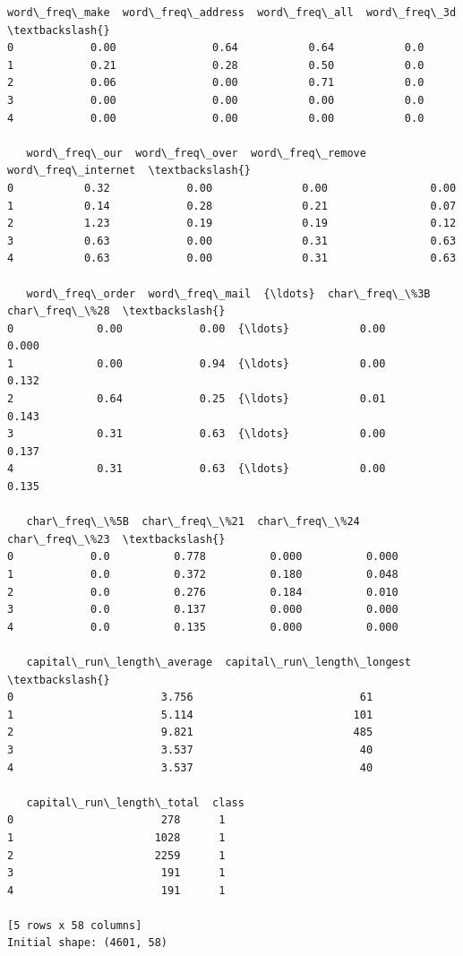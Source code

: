 \documentclass[12pt]{article}
\begin{document}
 \begin{Verbatim}[commandchars=\\\{\}]
   word\_freq\_make  word\_freq\_address  word\_freq\_all  word\_freq\_3d  \textbackslash{}
0            0.00               0.64           0.64           0.0
1            0.21               0.28           0.50           0.0
2            0.06               0.00           0.71           0.0
3            0.00               0.00           0.00           0.0
4            0.00               0.00           0.00           0.0

   word\_freq\_our  word\_freq\_over  word\_freq\_remove  word\_freq\_internet  \textbackslash{}
0           0.32            0.00              0.00                0.00
1           0.14            0.28              0.21                0.07
2           1.23            0.19              0.19                0.12
3           0.63            0.00              0.31                0.63
4           0.63            0.00              0.31                0.63

   word\_freq\_order  word\_freq\_mail  {\ldots}  char\_freq\_\%3B  char\_freq\_\%28  \textbackslash{}
0             0.00            0.00  {\ldots}           0.00          0.000
1             0.00            0.94  {\ldots}           0.00          0.132
2             0.64            0.25  {\ldots}           0.01          0.143
3             0.31            0.63  {\ldots}           0.00          0.137
4             0.31            0.63  {\ldots}           0.00          0.135

   char\_freq\_\%5B  char\_freq\_\%21  char\_freq\_\%24  char\_freq\_\%23  \textbackslash{}
0            0.0          0.778          0.000          0.000
1            0.0          0.372          0.180          0.048
2            0.0          0.276          0.184          0.010
3            0.0          0.137          0.000          0.000
4            0.0          0.135          0.000          0.000

   capital\_run\_length\_average  capital\_run\_length\_longest  \textbackslash{}
0                       3.756                          61
1                       5.114                         101
2                       9.821                         485
3                       3.537                          40
4                       3.537                          40

   capital\_run\_length\_total  class
0                       278      1
1                      1028      1
2                      2259      1
3                       191      1
4                       191      1

[5 rows x 58 columns]
Initial shape: (4601, 58)
    \end{Verbatim}
    
\end{document}
